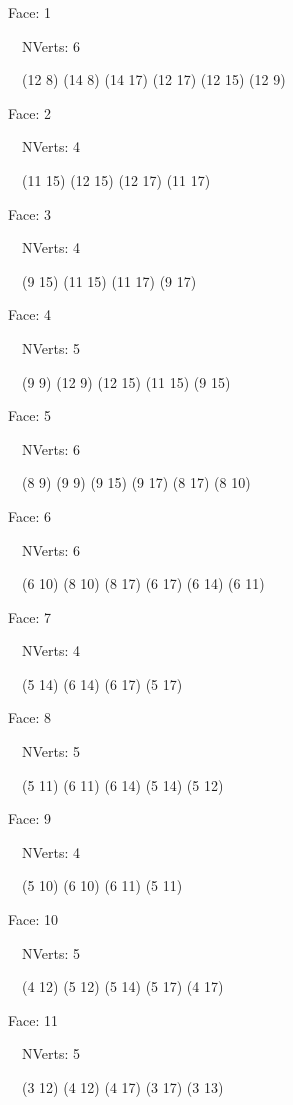 \documentclass{article}
\begin{document}
{\footnotesize 

Face: 1

\   \    NVerts: 6

 \   \   (12 8) (14 8) (14 17) (12 17) (12 15) (12 9)}

{\footnotesize 

Face: 2

\   \    NVerts: 4

 \   \   (11 15) (12 15) (12 17) (11 17)}

{\footnotesize 

Face: 3

\   \    NVerts: 4

 \   \   (9 15) (11 15) (11 17) (9 17)}

{\footnotesize 

Face: 4

\   \    NVerts: 5

 \   \   (9 9) (12 9) (12 15) (11 15) (9 15)}

{\footnotesize 

Face: 5

\   \    NVerts: 6

 \   \   (8 9) (9 9) (9 15) (9 17) (8 17) (8 10)}

{\footnotesize 

Face: 6

\   \    NVerts: 6

 \   \   (6 10) (8 10) (8 17) (6 17) (6 14) (6 11)}

{\footnotesize 

Face: 7

\   \    NVerts: 4

 \   \   (5 14) (6 14) (6 17) (5 17)}

{\footnotesize 

Face: 8

\   \    NVerts: 5

 \   \   (5 11) (6 11) (6 14) (5 14) (5 12)}

{\footnotesize 

Face: 9

\   \    NVerts: 4

 \   \   (5 10) (6 10) (6 11) (5 11)}

{\footnotesize 

Face: 10

\   \    NVerts: 5

 \   \   (4 12) (5 12) (5 14) (5 17) (4 17)}

{\footnotesize 

Face: 11

\   \    NVerts: 5

 \   \   (3 12) (4 12) (4 17) (3 17) (3 13)}
\end{document}
